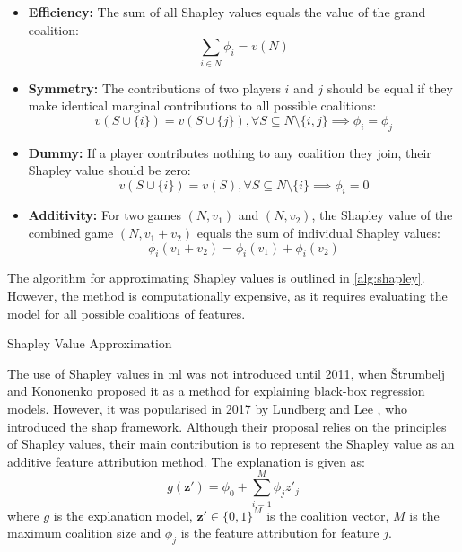 \begin{itemize}
    \item \textbf{Efficiency:} The sum of all Shapley values equals the value of the grand coalition:
    \[
        \sum_{i \in N} \phi_i = v(N)
    \]
    \item \textbf{Symmetry:} The contributions of two players $i$ and $j$ should be equal if they make identical marginal contributions to all possible coalitions:
    \[
        v(S \cup \{i\}) = v(S \cup \{j\}), \forall S \subseteq N \setminus \{i, j\} \implies \phi_i = \phi_j
    \]
    \item \textbf{Dummy:} If a player contributes nothing to any coalition they join, their Shapley value should be zero:
    \[
        v(S \cup \{i\}) = v(S), \forall S \subseteq N \setminus \{i\} \implies \phi_i = 0
    \]
    \item \textbf{Additivity:} For two games $(N,v_1)$ and $(N,v_2)$, the Shapley value of the combined game $(N,v_1+v_2)$ equals the sum of individual Shapley values:
    \[
        \phi_i(v_1 + v_2) = \phi_i(v_1) + \phi_i(v_2)
    \]
\end{itemize}

The algorithm for approximating Shapley values is outlined in \ref{alg:shapley}. However, the method is computationally expensive, as it requires evaluating the model for all possible coalitions of features.

\begin{algorithm}
\caption{Shapley Value Approximation}

\label{alg:shapley}
\end{algorithm}

The use of Shapley values in \acrshort{ml} was not introduced until 2011, when Štrumbelj and Kononenko \cite{Strumbelj2011} proposed it as a method for explaining black-box regression models. However, it was popularised in 2017 by Lundberg and Lee \cite{Lundberg2017}, who introduced the \acrshort{shap} framework. Although their proposal relies on the principles of Shapley values, their main contribution is to represent the Shapley value as an additive feature attribution method. The explanation is given as:
\begin{equation}
    g(\mathbf{z}') = \phi_0 + \sum_{i=1}^{M} \phi_j z'_j
\end{equation}
where $g$ is the explanation model, $\mathbf{z}' \in \{0,1\}^M$ is the coalition vector, $M$ is the maximum coalition size and $\phi_j$ is the feature attribution for feature $j$.

